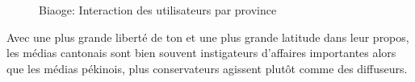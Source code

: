 \begin{figure}[htbp]
  \caption{
    Biaoge: Interaction des utilisateurs par province
  }
\end{figure}

Avec une plus grande liberté de ton et une plus grande latitude dans leur propos, les médias cantonais sont bien souvent instigateurs d{\textquoteright}affaires importantes alors que les médias pékinois, plus conservateurs agissent plut\^ot comme des diffuseurs.  

